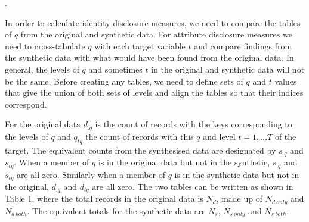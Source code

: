 \documentclass[12pt]{article}
\begin{document}
.

In order to calculate identity disclosure measures, we need to compare the tables of $q$ from the original and synthetic data. For attribute disclosure measures we need to cross-tabulate $q$ with each target variable $t$ and compare findings from the synthetic data with what would have been found from the original data.  In general, the levels of $q$ and sometimes $t$ in the original and synthetic data will not be the same. Before creating any tables, we need to define sets of $q$ and $t$ values that give the union of both sets of levels and align the tables so that their indices correspond.

For the original data $d_{.q}$ is the count of records with the keys corresponding to the levels of $q$ and $q_{tq}$ the count of records with this $q$ and level $t=1,...T$ of the target. The equivalent counts from the synthesised data are designated by $s_{.q}$ and  $s_{tq}$. When a member of $q$ is in the original data but not in the synthetic, $s_{.q}$ and  $s_{tq}$ are all zero. Similarly when a member of $q$ is in the synthetic data but not in the original,  $d_{.q}$ and  $d_{tq}$ are all zero. The two tables can be written as shown in Table 1, where the total records in the original data is $N_d$, made up of $N_{d~only}$ and $N_{d~both}$. The
equivalent totals  for the synthetic data are $N_s$, $N_{s~only}$ and $N_{s~both}$.
\end{document}
